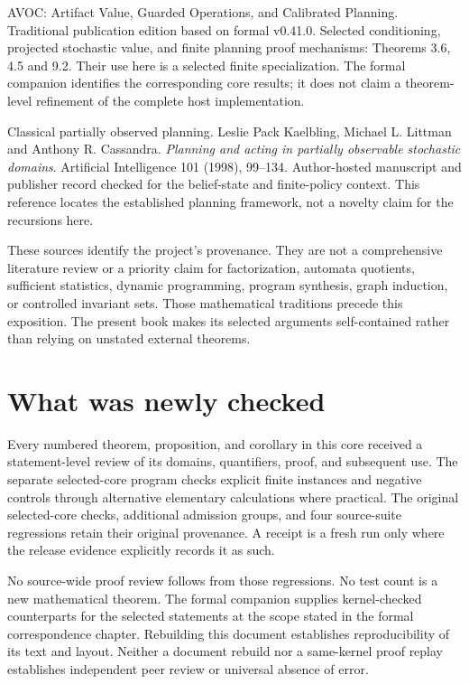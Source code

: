 \documentclass[11pt,oneside,openany]{book}
\theoremstyle{definition}\newtheorem{definition}[theorem]{Definition}
\begin{document}
\begin{description}[style=nextline]
\item[AVOC] AVOC: Artifact Value, Guarded Operations, and Calibrated Planning.
Traditional publication edition based on formal v0.41.0. Selected conditioning, projected stochastic value, and finite planning proof mechanisms: Theorems 3.6, 4.5 and 9.2. Their use here is a selected finite specialization. The formal companion identifies the corresponding core results; it does not claim a theorem-level refinement of the complete host implementation.

\item[KLC] Classical partially observed planning.
Leslie Pack Kaelbling, Michael L. Littman and Anthony R. Cassandra. \emph{Planning and acting in partially observable stochastic domains}. Artificial Intelligence 101 (1998), 99--134. Author-hosted manuscript and publisher record checked for the belief-state and finite-policy context. This reference locates the established planning framework, not a novelty claim for the recursions here.


\end{description}

These sources identify the project's provenance. They are not a comprehensive literature review or a priority claim for factorization, automata quotients, sufficient statistics, dynamic programming, program synthesis, graph induction, or controlled invariant sets. Those mathematical traditions precede this exposition. The present book makes its selected arguments self-contained rather than relying on unstated external theorems.

\section*{What was newly checked}
Every numbered theorem, proposition, and corollary in this core received a statement-level review of its domains, quantifiers, proof, and subsequent use. The separate selected-core program checks explicit finite instances and negative controls through alternative elementary calculations where practical. The original selected-core checks, additional admission groups, and four source-suite regressions retain their original provenance. A receipt is a fresh run only where the release evidence explicitly records it as such.

No source-wide proof review follows from those regressions. No test count is a new mathematical theorem. The formal companion supplies kernel-checked counterparts for the selected statements at the scope stated in the formal correspondence chapter. Rebuilding this document establishes reproducibility of its text and layout. Neither a document rebuild nor a same-kernel proof replay establishes independent peer review or universal absence of error.
\end{document}
